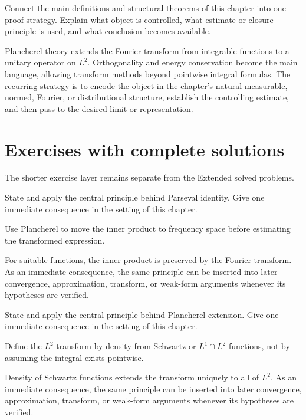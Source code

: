 \begin{problem}\label{prob:iii13-problem-12}
Connect the main definitions and structural theorems of this chapter into one proof strategy. Explain what object is controlled, what estimate or closure principle is used, and what conclusion becomes available.
\end{problem}
\begin{solution}
Plancherel theory extends the Fourier transform from integrable functions to a unitary operator on $L^2$. Orthogonality and energy conservation become the main language, allowing transform methods beyond pointwise integral formulas. The recurring strategy is to encode the object in the chapter's natural measurable, normed, Fourier, or distributional structure, establish the controlling estimate, and then pass to the desired limit or representation.
\end{solution}
\section{Exercises with complete solutions}
The shorter exercise layer remains separate from the Extended solved problems.

\begin{exercise}\label{exr:iii13-01}
State and apply the central principle behind Parseval identity. Give one immediate consequence in the setting of this chapter.
\end{exercise}
\begin{hint}
Use Plancherel to move the inner product to frequency space before estimating the transformed expression.
\end{hint}
\begin{solution}
For suitable functions, the inner product is preserved by the Fourier transform. As an immediate consequence, the same principle can be inserted into later convergence, approximation, transform, or weak-form arguments whenever its hypotheses are verified.
\end{solution}

\begin{exercise}\label{exr:iii13-02}
State and apply the central principle behind Plancherel extension. Give one immediate consequence in the setting of this chapter.
\end{exercise}
\begin{hint}
Define the \(L^2\) transform by density from Schwartz or \(L^1\cap L^2\) functions, not by assuming the integral exists pointwise.
\end{hint}
\begin{solution}
Density of Schwartz functions extends the transform uniquely to all of $L^2$. As an immediate consequence, the same principle can be inserted into later convergence, approximation, transform, or weak-form arguments whenever its hypotheses are verified.
\end{solution}

